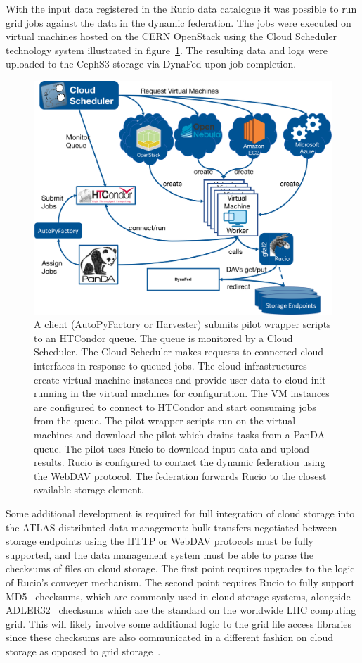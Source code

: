 \documentclass[a4paper]{jpconf}
\begin{document}
With the input data registered in the Rucio data catalogue it was possible to run grid jobs against the data in the dynamic federation. The jobs were executed on virtual machines hosted on the CERN OpenStack using the Cloud Scheduler technology system illustrated in figure~\ref{fig:atlas-cloud}. The resulting data and logs were uploaded to the CephS3 storage via DynaFed upon job completion.

\begin{figure}
  \includegraphics[width=\textwidth]{atlas-cloud-system.png}
  \caption{A client (AutoPyFactory or Harvester) submits pilot wrapper scripts to an HTCondor queue. The queue is monitored by a Cloud Scheduler. The Cloud Scheduler makes requests to connected cloud interfaces in response to queued jobs. The cloud infrastructures create virtual machine instances and provide user-data to cloud-init running in the virtual machines for configuration. The VM instances are configured to connect to HTCondor and start consuming jobs from the queue. The pilot wrapper scripts run on the virtual machines and download the pilot which drains tasks from a PanDA queue. The pilot uses Rucio to download input data and upload results. Rucio is configured to contact the dynamic federation using the WebDAV protocol. The federation forwards Rucio to the closest available storage element.}
  \label{fig:atlas-cloud}
\end{figure}

Some additional development is required for full integration of cloud storage into the ATLAS distributed data management: bulk transfers negotiated between storage endpoints using the HTTP or WebDAV protocols must be fully supported, and the data management system must be able to parse the checksums of files on cloud storage. The first point requires upgrades to the logic of Rucio's conveyer mechanism. The second point requires Rucio to fully support MD5~\cite{md5} checksums, which are commonly used in cloud storage systems, alongside ADLER32~\cite{adler32} checksums which are the standard on the worldwide LHC computing grid. This will likely involve some additional logic to the grid file access libraries since these checksums are also communicated in a different fashion on cloud storage as opposed to grid storage~\cite{content-md5, request-digest}.
\end{document}
